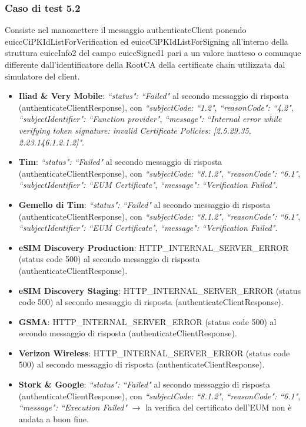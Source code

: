 \documentclass[10pt, oneside]{book}
\begin{document}
\subsubsection{Caso di test 5.2}
Consiste nel manomettere il messaggio authenticateClient ponendo euiccCiPKIdListForVerification ed euiccCiPKIdListForSigning all'interno della struttura euiccInfo2 del campo euiccSigned1 pari a un valore inatteso o comunque differente dall'identificatore della RootCA della certificate chain utilizzata dal simulatore del client.
\begin{itemize}
\item \textbf{Iliad \& Very Mobile}: \textit{``status": ``Failed"} al secondo messaggio di risposta (authenticateClientResponse), con \textit{``subjectCode: ``1.2"}, \textit{``reasonCode": ``4.2"}, \textit{``subjectIdentifier": ``Function provider"}, \textit{``message": ``Internal error while verifying token signature: invalid Certificate Policies: [2.5.29.35, 2.23.146.1.2.1.2]"}.
\item \textbf{Tim}: \textit{``status": ``Failed"} al secondo messaggio di risposta (authenticateClientResponse), con \textit{``subjectCode: ``8.1.2"}, \textit{``reasonCode": ``6.1"}, \textit{``subjectIdentifier": ``EUM Certificate"}, \textit{``message": ``Verification Failed"}.
\item \textbf{Gemello di Tim}: \textit{``status": ``Failed"} al secondo messaggio di risposta (authenticateClientResponse), con \textit{``subjectCode: ``8.1.2"}, \textit{``reasonCode": ``6.1"}, \textit{``subjectIdentifier": ``EUM Certificate"}, \textit{``message": ``Verification Failed"}.
\item \textbf{eSIM Discovery Production}: HTTP\_INTERNAL\_SERVER\_ERROR (status code 500) al secondo messaggio di risposta (authenticateClientResponse).
\item \textbf{eSIM Discovery Staging}: HTTP\_INTERNAL\_SERVER\_ERROR (status code 500) al secondo messaggio di risposta (authenticateClientResponse).
\item \textbf{GSMA}: HTTP\_INTERNAL\_SERVER\_ERROR (status code 500) al secondo messaggio di risposta (authenticateClientResponse).
\item \textbf{Verizon Wireless}: HTTP\_INTERNAL\_SERVER\_ERROR (status code 500) al secondo messaggio di risposta (authenticateClientResponse).
\item \textbf{Stork \& Google}: \textit{``status": ``Failed"} al secondo messaggio di risposta (authenticateClientResponse), con \textit{``subjectCode: ``8.1.2"}, \textit{``reasonCode": ``6.1"}, \textit{``message": ``Execution Failed"} $\rightarrow$ la verifica del certificato dell'EUM non è andata a buon fine.

\end{itemize}
\end{document}
